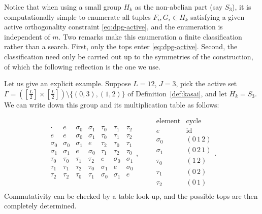 Notice that when using a small group $H_k$ as the non-abelian part (say $S_3$), it is computationally simple to enumerate all tuples $F_i, G_i\in H_k$ satisfying a given active orthogonality constraint \eqref{eq:dpg-active}, and the enumeration is independent of $m$. Two remarks make this enumeration a finite classification rather than a search. First, only the tops enter \eqref{eq:dpg-active}. Second, the classification need only be carried out up to the symmetries of the construction, of which the following reflection is the one we use.

Let us give an explicit example. Suppose $L = 12$, $J = 3$, pick the active set $\Gamma = \left([\frac L2]\times [\frac L2]\right) \setminus \{(0,3), (1,2)\}$ of Definition~\ref{def:kasai}, and let $H_k = S_3$. We can write down this group and its multiplication table as follows:

$$
\renewcommand{\arraystretch}{1.3}
\begin{array}{c|cccccc}
\cdot      & e        & \sigma_0 & \sigma_1 & \tau_0   & \tau_1   & \tau_2   \\ \hline
e          & e        & \sigma_0 & \sigma_1 & \tau_0   & \tau_1   & \tau_2   \\
\sigma_0   & \sigma_0 & \sigma_1 & e        & \tau_2   & \tau_0   & \tau_1   \\
\sigma_1   & \sigma_1 & e        & \sigma_0 & \tau_1   & \tau_2   & \tau_0   \\
\tau_0     & \tau_0   & \tau_1   & \tau_2   & e        & \sigma_0 & \sigma_1 \\
\tau_1     & \tau_1   & \tau_2   & \tau_0   & \sigma_1 & e        & \sigma_0 \\
\tau_2     & \tau_2   & \tau_0   & \tau_1   & \sigma_0 & \sigma_1 & e        \\
\end{array},
\qquad
\begin{array}{c|c}
\text{element} & \text{cycle} \\ \hline
e        & \mathrm{id}   \\
\sigma_0 & (0\,1\,2)     \\
\sigma_1 & (0\,2\,1)     \\
\tau_0   & (1\,2)        \\
\tau_1   & (0\,2)        \\
\tau_2   & (0\,1)        \\
\end{array}.
$$
Commutativity can be checked by a table look-up, and the possible tops are then completely determined.

